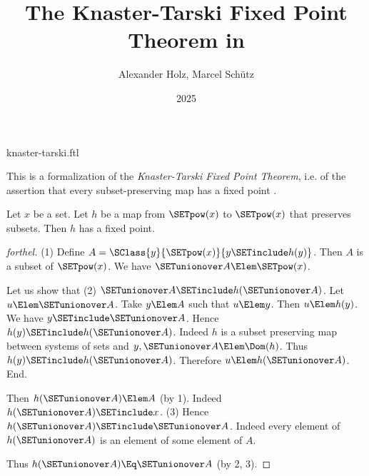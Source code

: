 \documentclass{stex}
\title{The Knaster-Tarski Fixed Point Theorem in \Naproche}
\author{Alexander Holz, Marcel Schütz}
\date{2025}
\begin{document}
\begin{smodule}{knaster-tarski.ftl}
\maketitle



\noindent This is a formalization of the \textit{Knaster-Tarski Fixed Point
Theorem}, i.e. of the assertion that every subset-preserving map has a fixed
point \cite{Schroeder2012}.

\begin{theorem}[forthel,title=Knaster-Tarski,name=Knaster-Tarski]
  Let $x$ be a set.
  Let $h$ be a map from $\SETpow(x)$ to $\SETpow(x)$ that preserves subsets.
  Then $h$ has a fixed point.
\end{theorem}
\begin{proof}[forthel]
  (1) Define $A = \SClass{y}{\SETpow(x)}{y \SETinclude h(y)}$.
  Then $A$ is a subset of $\SETpow(x)$.
  We have $\SETunionover A \Elem \SETpow(x)$.

  Let us show that (2) $\SETunionover A \SETinclude h(\SETunionover A)$.
    Let $u \Elem \SETunionover A$.
    Take $y \Elem A$ such that $u \Elem y$.
    Then $u \Elem h(y)$.
    We have $y \SETinclude \SETunionover A$.
    Hence $h(y) \SETinclude h(\SETunionover A)$.
    Indeed $h$ is a subset preserving map between systems of sets and $y, \SETunionover A \Elem \Dom(h)$.
    Thus $h(y) \SETinclude h(\SETunionover A)$.
    Therefore $u \Elem h(\SETunionover A)$.
  End.

  Then $h(\SETunionover A) \Elem A$ (by 1).
  Indeed $h(\SETunionover A) \SETinclude x$.
  (3) Hence $h(\SETunionover A) \SETinclude \SETunionover A$.
  Indeed every element of $h(\SETunionover A)$ is an element of some element of
  $A$.

  Thus $h(\SETunionover A) \Eq \SETunionover A$ (by 2, 3).
\end{proof}


\printbibliography
{}
\end{smodule}
\end{document}
